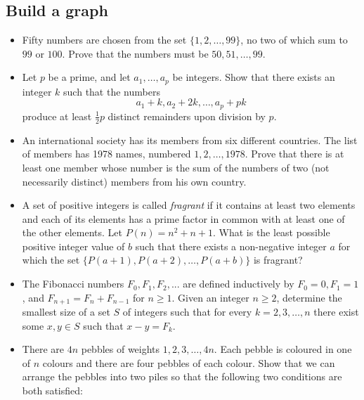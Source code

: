 \subsection{Build a graph}
\begin{itemize}
    \item Fifty numbers are chosen from the set $\{1,2,\ldots,99\}$, no two of
        which sum to $99$ or $100$. Prove that the numbers must be
        $50,51,\ldots,99$.
    \item Let $p$ be a prime, and let $a_1, \dots, a_p$ be integers. Show that
        there exists an integer $k$ such that the numbers
        \[a_1 + k, a_2 + 2k, \dots, a_p + pk\]produce at least $\tfrac{1}{2} p$
        distinct remainders upon division by $p$.
    \item An international society has its members from six different
        countries. The list of members has 1978 names, numbered $1, 2,
        \ldots, 1978$. Prove that there is at least one member whose
        number is the sum of the numbers of two (not necessarily
    distinct) members from his own country. 
\item A set of positive integers is called \emph{fragrant} if it contains at least two
    elements and each of its elements has a prime factor in common with at least
    one of the other elements. Let $P(n)=n^2+n+1$. What is the least possible
    positive integer value of $b$ such that there exists a non-negative integer
    $a$ for which the set $\{P(a+1),P(a+2),\ldots,P(a+b)\}$ is fragrant?
    \item The Fibonacci numbers $F_0, F_1, F_2, . . .$ are defined inductively
        by $F_0=0, F_1=1$, and $F_{n+1}=F_n+F_{n-1}$ for $n \ge 1$. Given an
        integer $n \ge 2$, determine the smallest size of a set $S$ of integers
        such that for every $k=2, 3, \ldots , n$ there exist some $x, y \in S$
        such that $x-y=F_k$.
    \item  There are $4n$ pebbles of weights $1, 2, 3, \dots, 4n.$ Each pebble
        is coloured in one of $n$ colours and there are four pebbles of each
        colour. Show that we can arrange the pebbles into two piles so that the
        following two conditions are both satisfied:


\end{itemize}
